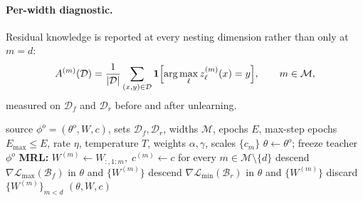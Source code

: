 \paragraph{Per-width diagnostic.}
Residual knowledge is reported at every nesting dimension rather than only at
$m = d$:
\begin{equation}
  A^{(m)}(\mathcal{D}) = \frac{1}{|\mathcal{D}|}
  \sum_{(x,y) \in \mathcal{D}} \mathbf{1}\Bigl[\arg\max_{\ell} z^{(m)}_{\ell}(x) = y\Bigr],
  \qquad m \in \mathcal{M},
\end{equation}
measured on $\mathcal{D}_f$ and $\mathcal{D}_r$ before and after unlearning.

\begin{algorithm}[t]
\caption{MMU: SCRUB under MRL Eq.~\eqref{eq:mrl}}
\label{alg:mmu}
\begin{algorithmic}[1]
  \Require source $\phi^{o} = (\theta^{o}, W, c)$, sets $\mathcal{D}_f,
    \mathcal{D}_r$, widths $\mathcal{M}$, epochs $E$, max-step epochs
    $E_{\max} \le E$, rate $\eta$, temperature $T$, weights $\alpha, \gamma$,
    scales $\{c_m\}$
  \State $\theta \gets \theta^{o}$; freeze teacher $\phi^{o}$
  \State \textbf{MRL:} $W^{(m)} \gets W_{:,1:m},\; c^{(m)} \gets c$ for every
         $m \in \mathcal{M} \setminus \{d\}$ 
        \State descend $\nabla \mathcal{L}_{\mathrm{max}}(\mathcal{B}_f)$ in
               $\theta$ and $\{W^{(m)}\}$ 
      \EndFor
    \EndIf
      \State descend $\nabla \mathcal{L}_{\mathrm{min}}(\mathcal{B}_r)$ in
             $\theta$ and $\{W^{(m)}\}$ 
    \EndFor
  \EndFor
  \State discard $\{W^{(m)}\}_{m < d}$
  \State \Return $(\theta, W, c)$
\end{algorithmic}
\end{algorithm}
